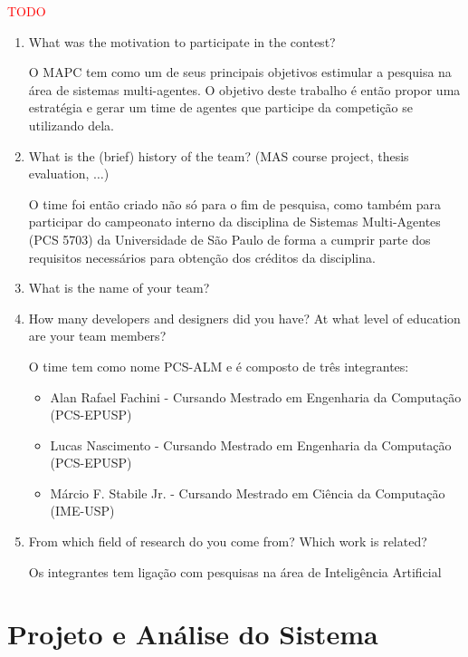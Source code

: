 \documentclass{llncs}
\begin{document}
\textcolor{red}{TODO}
\begin{enumerate}
\item What was the motivation to participate in the contest?

O MAPC tem como um de seus principais objetivos estimular a pesquisa na área de sistemas multi-agentes. O objetivo deste trabalho é então propor uma estratégia e gerar um time de agentes que participe da competição se utilizando dela.
\item What is the (brief) history of the team? (MAS course project,
  thesis evaluation, $\ldots$)

O time foi então criado não só para o fim de pesquisa, como também para participar do campeonato interno da disciplina de Sistemas Multi-Agentes (PCS 5703) da Universidade de São Paulo de forma a cumprir parte dos requisitos necessários para obtenção dos créditos da disciplina.

\item What is the name of your team?
\item How many developers and designers did you have? At what level of education are your team members?

O time tem como nome PCS-ALM e é composto de três integrantes:
\begin{itemize}
\item Alan Rafael Fachini - Cursando Mestrado em Engenharia da Computação (PCS-EPUSP)
\item Lucas Nascimento - Cursando Mestrado em Engenharia da Computação (PCS-EPUSP)
\item Márcio F. Stabile Jr. - Cursando Mestrado em Ciência da Computação (IME-USP)
\end{itemize}

\item From which field of research do you come from? Which work is related?

Os integrantes tem ligação com pesquisas na área de Inteligência Artificial
\end{enumerate}

\section{Projeto e Análise do Sistema}
\end{document}
